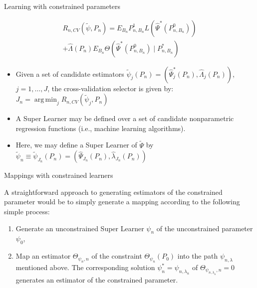 \documentclass[12pt,t]{beamer}
\DeclareMathOperator*{\argmin}{arg\,min}
\begin{document}
\begin{frame}[c]{Learning with constrained parameters}

\begin{center}
\begin{equation}
\begin{split}
  R_{n, CV}(\tilde{\psi}, P_n) = E_{B_n}P_{n, B_n}^1L(\hat{\Psi}^*(P_{n,
    B_n}^0)) \\ + \hat{\Lambda}(P_n) E_{B_n} \Theta(\hat{\Psi}^*(P_{n, B_n}^0)
    \mid P_{n, B_n}^*)
\end{split}
\end{equation}
\begin{itemize}
  \itemsep12pt
  \item Given a set of candidate estimators $\widetilde{\psi}_j(P_n) =
    (\hat{\Psi}_j^*(P_n), \hat{\Lambda}_j(P_n))$, $j = 1, \ldots, J$, the
    cross-validation selector is given by: $J_n = \argmin_j R_{n,
      CV}(\widetilde{\psi}_j, P_n)$
  \item A Super Learner may be defined over a set of candidate nonparametric
    regression functions (i.e., machine learning algorithms).
  \item Here, we may define a Super Learner of $\widetilde{\Psi}$ by
    $\widetilde{\psi}_n \equiv \widetilde{\psi}_{J_n}(P_n) =
    (\hat{\Psi}_{J_n}(P_n), \hat{\lambda}_{J_n}(P_n))$
\end{itemize}
\end{center}

\note{
}

\end{frame}


\begin{frame}[c]{Mappings with constrained learners}

\begin{center}
A straightforward approach to generating estimators of the constrained parameter
would be to simply generate a mapping according to the following simple process:

\vspace*{1em}

\begin{enumerate}
  \itemsep12pt
  \item Generate an unconstrained Super Learner $\psi_n$ of the unconstrained
    parameter $\psi_0$,
  \item Map an estimator $\Theta_{\psi_n, n}$ of the constraint
    $\Theta_{\psi_n}(P_0)$ into the path $\psi_{n, \lambda}$ mentioned above.
    The corresponding solution $\psi_n^* = \psi_{n, \lambda_n}$ of
    $\Theta_{\psi_{n, \lambda_n}, n}= 0$ generates an estimator of the
    constrained parameter.
\end{enumerate}
\end{center}

\note{
}

\end{frame}
\end{document}
